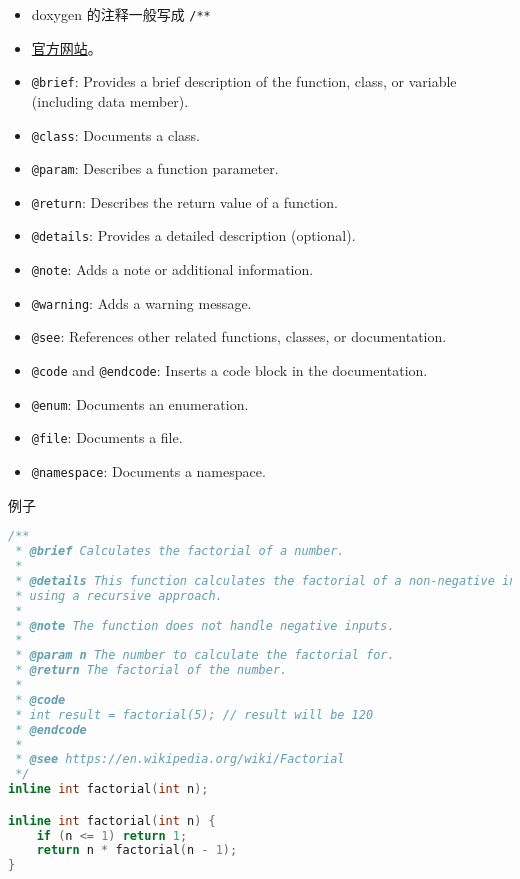 
\begin{itemize}
\item doxygen 的注释一般写成 \verb`/** `
\item \href{https://www.doxygen.nl/}{官方网站}。
\item \verb`@brief`: Provides a brief description of the function, class, or variable (including data member).
\item \verb`@class`: Documents a class.
\item \verb`@param`: Describes a function parameter.
\item \verb`@return`: Describes the return value of a function.
\item \verb`@details`: Provides a detailed description (optional).
\item \verb`@note`: Adds a note or additional information.
\item \verb`@warning`: Adds a warning message.
\item \verb`@see`: References other related functions, classes, or documentation.
\item \verb`@code` and \verb`@endcode`: Inserts a code block in the documentation.
\item \verb`@enum`: Documents an enumeration.
\item \verb`@file`: Documents a file.
\item \verb`@namespace`: Documents a namespace.
\end{itemize}

例子
\begin{lstlisting}[language=cpp,caption=factorial.hpp]
/**
 * @brief Calculates the factorial of a number.
 *
 * @details This function calculates the factorial of a non-negative integer
 * using a recursive approach.
 *
 * @note The function does not handle negative inputs.
 *
 * @param n The number to calculate the factorial for.
 * @return The factorial of the number.
 *
 * @code
 * int result = factorial(5); // result will be 120
 * @endcode
 *
 * @see https://en.wikipedia.org/wiki/Factorial
 */
inline int factorial(int n);

inline int factorial(int n) {
    if (n <= 1) return 1;
    return n * factorial(n - 1);
}
\end{lstlisting}

